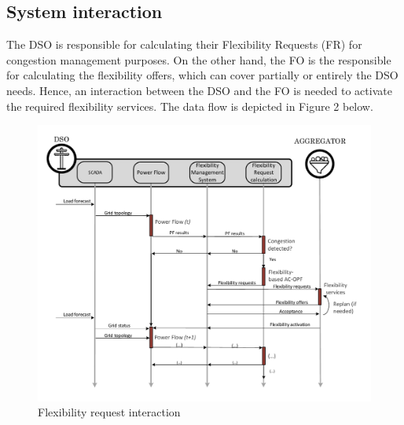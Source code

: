 
\subsection{System interaction}
The DSO is responsible for calculating their Flexibility Requests (FR) for congestion management purposes. On the other hand, the FO is the responsible for calculating the flexibility offers, which can cover partially or entirely the DSO needs. Hence, an interaction between the DSO and the FO is needed to activate the required flexibility services. The data flow is depicted in Figure 2 below.

\begin{figure}[h]
	\centering
	\includegraphics[width=1\columnwidth ]{ChapterOPF_DSO/Figures/OPF_interaction_ACOPF.pdf}
		\caption{Flexibility request interaction}
	\label{fig:pimodel}  
\end{figure}


